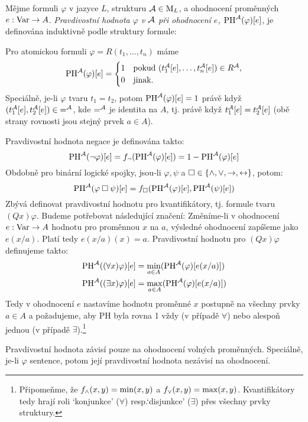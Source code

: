 \begin{definition}
Mějme formuli $\varphi$ v jazyce $L$, strukturu $\mathcal{A}\in\operatorname{M}_L$,  a ohodnocení proměnných $e:\operatorname{Var}\to A$. \emph{Pravdivostní hodnota $\varphi$ v $\mathcal{A}$ při ohodnocení $e$, $\mathrm{PH}^{\mathcal{A}}(\varphi)[e]$}, je definována induktivně podle struktury formule:

Pro atomickou formuli $\varphi=R(t_1,\dots,t_n)$ máme 
$$
\mathrm{PH}^{\mathcal{A}}(\varphi)[e]=
\begin{cases}
    1 & \text{pokud }(t_1^{\mathcal{A}}[e],\dots,t_n^{\mathcal{A}}[e])\in R^{\mathcal{A}},\\
    0 & \text{jinak.}    
\end{cases}
$$
Speciálně, je-li $\varphi$ tvaru $t_1=t_2$, potom $\mathrm{PH}^{\mathcal{A}}(\varphi)[e]=1$ právě když $(t_1^{\mathcal{A}}[e],t_2^{\mathcal{A}}[e])\in {=^{\mathcal{A}}}$, kde $=^{\mathcal{A}}$ je identita na $A$, tj. právě když $t_1^{\mathcal{A}}[e]=t_2^{\mathcal{A}}[e]$ (obě strany rovnosti jsou stejný prvek $a\in A$).

Pravdivostní hodnota negace je definována takto:
$$
\mathrm{PH}^{\mathcal{A}}(\neg \varphi)[e]=f_\neg(\mathrm{PH}^{\mathcal{A}}(\varphi)[e])=1-\mathrm{PH}^{\mathcal{A}}(\varphi)[e]
$$
Obdobně pro binární logické spojky, jsou-li $\varphi,\psi$ a ${\mathbin{\square}}\in\{{\land},{\lor},{\mathbin{\rightarrow}},{\mathbin{\leftrightarrow}}\}$, potom:
$$
\mathrm{PH}^{\mathcal{A}}(\varphi\mathbin{\square}\psi)[e]=f_{\mathbin{\square}}(\mathrm{PH}^{\mathcal{A}}(\varphi)[e],\mathrm{PH}^{\mathcal{A}}(\psi)[e])
$$
Zbývá definovat pravdivostní hodnotu pro kvantifikátory, tj. formule tvaru $(Qx)\varphi$. Budeme potřebovat následující značení: Změníme-li v ohodnocení $e:\operatorname{Var}\to A$ hodnotu pro proměnnou $x$ na $a$, výsledné ohodnocení zapíšeme jako $e(x/a)$. Platí tedy $e(x/a)(x)=a$. Pravdivostní hodnotu pro $(Qx)\varphi$ definujeme takto:
\begin{align*}
    \mathrm{PH}^{\mathcal{A}}((\forall x)\varphi)[e]&=\min_{a\in A}(\mathrm{PH}^{\mathcal{A}}(\varphi)[e(x/a)])\\ 
    \mathrm{PH}^{\mathcal{A}}((\exists x)\varphi)[e]&=\max_{a\in A}(\mathrm{PH}^{\mathcal{A}}(\varphi)[e(x/a)])
\end{align*}
Tedy v ohodnocení $e$ nastavíme hodnotu proměnné $x$ postupně na všechny prvky $a\in A$ a požadujeme, aby PH byla rovna 1 vždy (v případě $\forall$) nebo alespoň jednou (v případě $\exists$).\footnote{Připomeňme, že $f_{\land}(x,y)=\min(x,y)$ a $f_{\lor}(x,y)=\max(x,y)$. Kvantifikátory tedy hrají roli `konjunkce' ($\forall$) resp.`disjunkce' ($\exists$) přes všechny prvky struktury.}
\end{definition}

\begin{remark}
    Pravdivostní hodnota závisí pouze na ohodnocení volných proměnných. Speciálně, je-li $\varphi$ sentence, potom její pravdivostní hodnota nezávisí na ohodnocení.
\end{remark}

